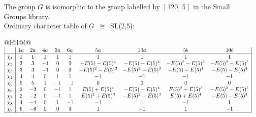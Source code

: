 \documentclass[varwidth=\maxdimen,border=10]{standalone}
\begin{document}
The group $G$ is isomorphic to the group labelled by\ [ 120, 5 ]\ in the Small Groups library.\\
Ordinary character table of $G$\ $\cong$\ SL(2,5):\\
\begin{center}
\begin{tabular}{@{}l@{}l@{}l@{}}
\hline
\(\begin{array}{|l|ccccccccc|}
  & 1a & 2a & 4a & 3a & 6a & 5a & 10a & 5b & 10b\\ \hline
\chi_{1} & 1 & 1 & 1 & 1 & 1 & 1 & 1 & 1 & 1\\
\chi_{2} & 3 & 3 & -1 & 0 & 0 & -E(5)-E(5)^{4} & -E(5)-E(5)^{4} & -E(5)^{2}-E(5)^{3} & -E(5)^{2}-E(5)^{3}\\
\chi_{3} & 3 & 3 & -1 & 0 & 0 & -E(5)^{2}-E(5)^{3} & -E(5)^{2}-E(5)^{3} & -E(5)-E(5)^{4} & -E(5)-E(5)^{4}\\
\chi_{4} & 4 & 4 & 0 & 1 & 1 & -1 & -1 & -1 & -1\\
\chi_{5} & 5 & 5 & 1 & -1 & -1 & 0 & 0 & 0 & 0\\
\chi_{6} & 2 & -2 & 0 & -1 & 1 & E(5)+E(5)^{4} & -E(5)-E(5)^{4} & E(5)^{2}+E(5)^{3} & -E(5)^{2}-E(5)^{3}\\
\chi_{7} & 2 & -2 & 0 & -1 & 1 & E(5)^{2}+E(5)^{3} & -E(5)^{2}-E(5)^{3} & E(5)+E(5)^{4} & -E(5)-E(5)^{4}\\
\chi_{8} & 4 & -4 & 0 & 1 & -1 & -1 & 1 & -1 & 1\\
\chi_{9} & 6 & -6 & 0 & 0 & 0 & 1 & -1 & 1 & -1\\
\hline
\end{array}\)\\
\end{tabular}
\end{center}
\end{document}
